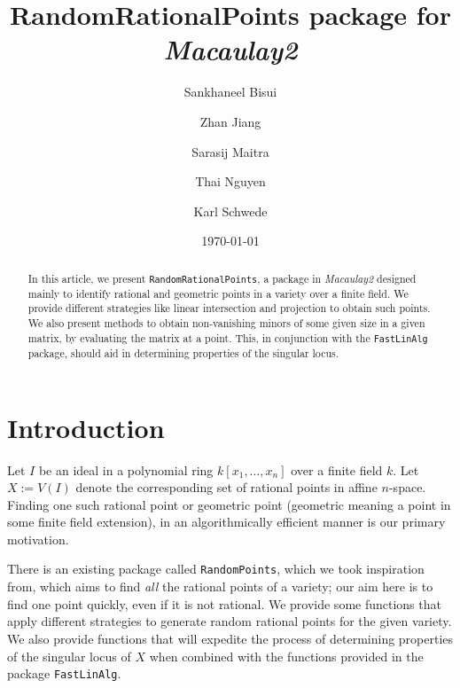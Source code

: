 \documentclass[11pt]{amsart}
\theoremstyle{definition}
\begin{document}
\title{{RandomRationalPoints} package for \emph{Macaulay2}}
\author{Sankhaneel Bisui}
\address{Tulane University}
\author{Zhan Jiang}
\address{University of Michigan}
\author{Sarasij Maitra}
\address{University of Virginia}
\author{Thai Nguyen}
\address{Tulane University}
\author{Karl Schwede}
\address{Department of Mathematics, University of Utah, 155 S 1400 E Room 233, Salt Lake City, UT, 84112}
\date{\today}

\begin{abstract}
In this article, we present {\tt RandomRationalPoints}, a package in \emph{Macaulay2} designed mainly to identify rational and geometric points in a variety over a finite field. We provide different strategies like linear intersection and projection to obtain such points. We also present methods to obtain non-vanishing minors of some given size in a given matrix, by evaluating the matrix at a point.  This, in conjunction with the {\tt FastLinAlg} package, should aid in determining properties of the singular locus.
\end{abstract}

 

\maketitle

\section{Introduction}
 Let $I$ be an ideal in a polynomial ring $k[x_1,\dots, x_n]$ over a finite field $k$. Let $X:=V(I)$ denote the corresponding set of rational points in affine $n$-space. Finding one such rational point or geometric point (geometric meaning a point in some finite field extension), in an algorithmically efficient manner is our primary motivation. 
 
 There is an existing package called {\tt RandomPoints}, which we took inspiration from, which aims to find \emph{all} the rational points of a variety; our aim here is to find one point quickly, even if it is not rational.  
 We provide some functions that apply different strategies to generate random rational points for the given variety. We also provide functions that will expedite the process of determining properties of the singular locus of $X$ when combined with the functions provided in the package {\tt FastLinAlg}.  
 
\end{document}
